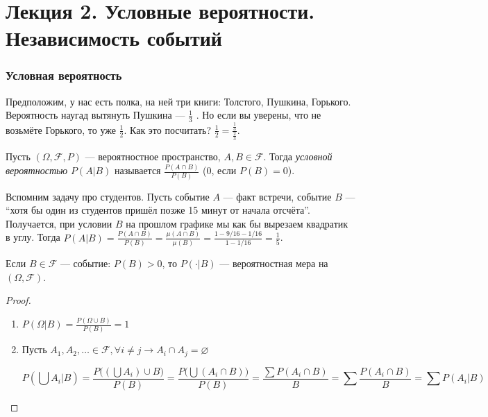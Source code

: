 \part*{Лекция 2. Условные вероятности. Независимость событий}

\section{Условная вероятность}

Предположим, у нас есть полка, на ней три книги: Толстого, Пушкина, Горького. Вероятность наугад вытянуть Пушкина --- $\frac13$ .
Но если вы уверены, что не возьмёте Горького, то уже $\frac12$. Как это посчитать? $\frac12 = \frac{\frac13}{\frac23}$.

\begin{define*}
  Пусть $(\Omega, \mathcal{F}, P)$ --- вероятностное пространство, $A, B \in \mathcal{F} $. Тогда \emph{условной вероятностью} $P(A|B)$ 
  называется $\frac{P(A\cap B)}{P(B)}$ (0, если $P(B) = 0$).
\end{define*}

\begin{example}
  Вспомним задачу про студентов. Пусть событие $A$ --- факт встречи, 
  событие $B$ --- ``хотя бы один из студентов пришёл позже 15 минут от начала отсчёта''. 
  Получается, при условии $B$ на прошлом графике мы как бы вырезаем квадратик в углу. Тогда
  $P(A|B) = \frac{P(A\cap B)}{P(B)} = \frac{\mu(A\cap B)}{\mu(B)} = \frac{1 - 9/16 - 1/16}{1 - 1/16} = \frac{1}{5}$.
\end{example}

\begin{claim}
  Если $B \in \mathcal{F} $ --- событие: $P(B) > 0$, то $P(\cdot |B)$ --- вероятностная мера на $(\Omega, \mathcal{F} )$.

  \begin{proof}
	\begin{enumerate}
	  \item $P(\Omega|B) = \frac{P(\Omega \cup B)}{P(B)} = 1$
	  \item Пусть $A_1, A_2, \ldots \in \mathcal{F}, \forall i \neq j \to A_i \cap A_j =  \varnothing $

		\[
		  P\left(\bigcup A_i | B\right) = \frac{P\bigl((\bigcup A_i) \cup B\bigr)}{P(B)} 
		  = \frac{P\bigl(\bigcup (A_i \cap B)\bigr)}{P(B)} = \frac{\sum P(A_i \cap B)}{B}
		  = \sum \frac{P(A_i \cap B)}{B} = \sum P(A_i | B)
		\]
	\end{enumerate}
  \end{proof}
\end{claim}

